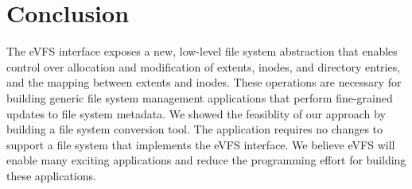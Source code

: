 \documentclass[letterpaper,twocolumn,10pt]{article}
\begin{document}

\vspace{-0.75em}
\section{Conclusion\label{sec:Conclusion}}

The eVFS interface exposes a new, low-level file system abstraction that enables control over allocation and modification of extents, inodes, and directory entries, and the mapping between extents and inodes. These operations are necessary for building generic file system management applications that perform fine-grained updates to file system metadata. We showed the feasiblity of our approach by building a file system conversion tool. The application requires no changes to support a file system that implements the eVFS interface. We believe eVFS will enable many exciting applications and reduce the programming effort for building these applications.

{\footnotesize 
}
\end{document}
